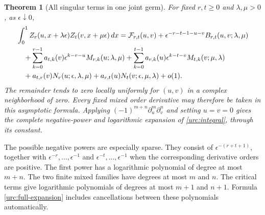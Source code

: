 \documentclass[11pt,a4paper]{article}
\newtheorem{theorem}{Theorem}[section]
\theoremstyle{definition}
\theoremstyle{remark}
\numberwithin{equation}{section}
\begin{document}
\begin{theorem}[All singular terms in one joint germ]
\label{urc:full-theorem}
For fixed $r,t\ge0$ and $\lambda,\mu>0$, as $\epsilon\downarrow0$,
\begin{align}
 &\int_0^1Z_r(u,x+\lambda\epsilon)Z_t(v,x+\mu\epsilon)\,dx
 =\mathcal F_{r,t}(u,v)
   +\epsilon^{-r-t-1-u-v}B_{r,t}(u,v;\lambda,\mu)\notag\\
 &\quad+\sum_{k=0}^{r-1}a_{t,k}(v)
               \epsilon^{k-r-u}M_{r,k}(u;\lambda,\mu)
       +\sum_{k=0}^{t-1}a_{r,k}(u)
               \epsilon^{k-t-v}M_{t,k}(v;\mu,\lambda)\notag\\
 &\quad+a_{t,r}(v)N_r(u;\epsilon,\lambda,\mu)
       +a_{r,t}(u)N_t(v;\epsilon,\mu,\lambda)+o(1).
 \label{urc:full-expansion}
\end{align}
The remainder tends to zero locally uniformly for $(u,v)$ in a
complex neighborhood of zero. Every fixed mixed order derivative
may therefore be taken in this asymptotic formula. Applying
$(-1)^{m+n}\partial_u^m\partial_v^n$ and setting $u=v=0$ gives
the complete negative-power and logarithmic expansion of
\eqref{urc:integral}, through its constant.
\end{theorem}

The possible negative powers are especially sparse. They consist of
$\epsilon^{-(r+t+1)}$, together with $\epsilon^{-r},\ldots,
\epsilon^{-1}$ and $\epsilon^{-t},\ldots,\epsilon^{-1}$ when the
corresponding derivative orders are positive. The first power has
a logarithmic polynomial of degree at most $m+n$. The two finite
mixed families have degrees at most $m$ and $n$. The critical
terms give logarithmic polynomials of degrees at most $m+1$ and
$n+1$. Formula \eqref{urc:full-expansion} includes cancellations
between these polynomials automatically.
\end{document}
